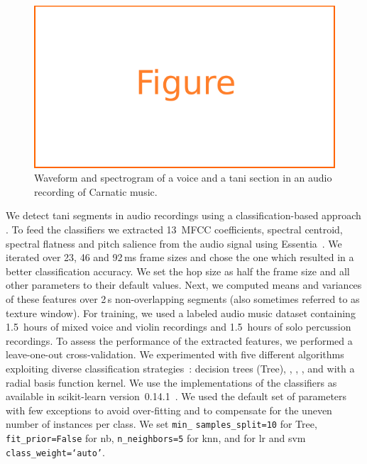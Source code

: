 {\begin{figure}
	\begin{center}
		\includegraphics[width=\figSizeNinety]{ch05_preprocessing/figures/figure_todo.pdf}
	\end{center}
	\caption{Waveform and spectrogram of a voice and a \gls{tani} section in an audio recording of Carnatic music.}
	\label{fig:spectrogram_of_tani_segment}
\end{figure}

We detect \gls{tani} segments in audio recordings using a classification-based approach . To feed the classifiers we extracted 13~MFCC coefficients, spectral centroid, spectral flatness and pitch salience \citep{slaney1998auditory} from the audio signal using Essentia~\citep{essentia}. We iterated over 23, 46 and 92\,ms frame sizes and chose the one which resulted in a better classification accuracy. We set the hop size as half the frame size and all other parameters to their default values. Next, we computed means and variances of these features over 2\,s non-overlapping segments (also sometimes referred to as texture window). For training, we used a labeled audio music dataset containing 1.5~hours of mixed voice and violin recordings and 1.5~hours of solo percussion recordings. To assess the performance of the extracted features, we performed a leave-one-out cross-validation. We experimented with five different algorithms exploiting diverse classification strategies~\cite{Hastie09BOOK}: decision trees (Tree), , , , and  with a radial basis function kernel. We use the implementations of the classifiers as available in scikit-learn version~0.14.1~\citep{scikitlearn}. We used the default set of parameters with few exceptions to avoid over-fitting and to compensate for the uneven number of instances per class. We set \texttt{min\_} \texttt{samples\_split=10} for Tree, \texttt{fit\_prior=False} for \gls{nb}, \texttt{n\_neighbors=5} for \gls{knn}, and for \gls{lr} and \gls{svm} \texttt{class\_weight=`auto'}. 

}
